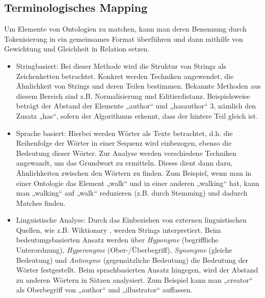 		\subsection{Terminologisches Mapping}
		Um Elemente von Ontologien zu matchen, kann man deren Benennung durch Tokenisierung in ein gemeinsames Format überführen und dann mithilfe von Gewichtung und Gleichheit in Relation setzen.
		\begin{itemize}
			\item Stringbasiert: Bei dieser Methode wird die Struktur von Strings als
			Zeichenketten betrachtet. Konkret werden Techniken angewendet, die Ähnlichkeit von Strings und deren Teilen bestimmen. Bekannte Methoden aus diesem Bereich sind z.B. Normalisierung und Editierdistanz. \cite{Euz07}  Beispielsweise beträgt der Abstand der Elemente „author“ und „hasauthor“ 3, nämlich den Zusatz „has“, sofern der Algorithmus erkennt, dass der hintere Teil gleich ist.
			\item  Sprache basiert: Hierbei werden Wörter als Texte betrachtet, d.h. die
			Reihenfolge der Wörter in einer Sequenz wird einbezogen, ebenso die Bedeutung dieser Wörter. Zur Analyse werden verschiedene Techniken angewandt, um das Grundwort zu ermitteln. Dieses dient dann dazu, Ähnlichkeiten zwischen den Wörtern zu finden. \cite{Euz07}  Zum Beispiel, wenn man in einer Ontologie das Element „walk“ und in einer anderen „walking“ hat, kann man „walking“ auf „walk“ reduzieren (z.B. durch Stemming) und dadurch Matches finden.
			\item Linguistische Analyse: Durch das Einbeziehen von externen
			linguistischen Quellen, wie z.B. Wiktionary , werden Strings interpretiert.
			Beim bedeutungsbasierten Ansatz werden über \textit{Hyponyme} (begriffliche
			Unterordnung), \textit{Hyperonyme} (Ober-/Überbegriff), \textit{Synonyme}
			(gleiche Bedeutung) und \textit{Antonyme} (gegensätzliche Bedeutung) die
			Bedeutung der Wörter festgestellt. Beim sprachbasierten Ansatz hingegen, wird der Abstand zu anderen Wörtern in Sätzen analysiert. \cite{Euz07} Zum Beispiel kann man „creator“ als Oberbegriff von „author“ und „illustrator“ auffassen.
		\end{itemize}
		
